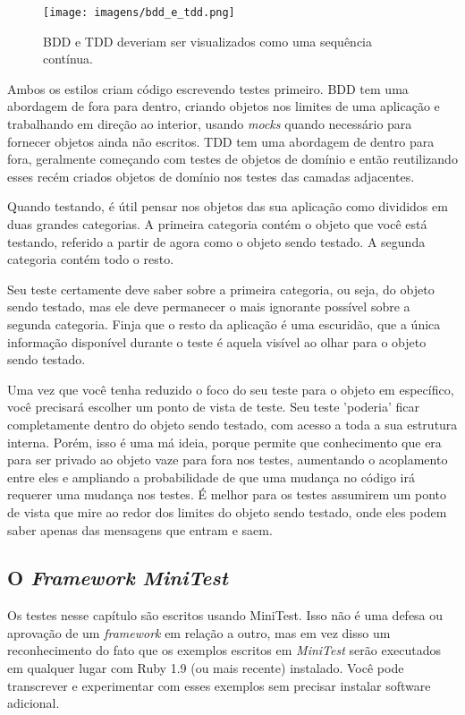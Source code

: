 \begin{figure}[!htbp]
  \center
  \texttt{[image: imagens/bdd\_e\_tdd.png]}
  \caption{BDD e TDD deveriam ser visualizados como uma sequência contínua.}
  \label{img:bdd_e_tdd}
\end{figure}

Ambos os estilos criam código escrevendo testes primeiro. BDD tem uma abordagem de fora para dentro, criando objetos nos limites de uma aplicação e trabalhando em direção ao interior, usando \textit{mocks} quando necessário para fornecer objetos ainda não escritos. TDD tem uma abordagem de dentro para fora, geralmente começando com testes de objetos de domínio e então reutilizando esses recém criados objetos de domínio nos testes das camadas adjacentes.

Quando testando, é útil pensar nos objetos das sua aplicação como divididos em duas grandes categorias. A primeira categoria contém o objeto que você está testando, referido a partir de agora como o objeto sendo testado. A segunda categoria contém todo o resto.

Seu teste certamente deve saber sobre a primeira categoria, ou seja, do objeto sendo testado, mas ele deve permanecer o mais ignorante possível sobre a segunda categoria. Finja que o resto da aplicação é uma escuridão, que a única informação disponível durante o teste é aquela visível ao olhar para o objeto sendo testado.

Uma vez que você tenha reduzido o foco do seu teste para o objeto em específico, você precisará escolher um ponto de vista de teste. Seu teste 'poderia' ficar completamente dentro do objeto sendo testado, com acesso a toda a sua estrutura interna. Porém, isso é uma má ideia, porque permite que conhecimento que era para ser privado ao objeto vaze para fora nos testes, aumentando o acoplamento entre eles e ampliando a probabilidade de que uma mudança no código irá requerer uma mudança nos testes. É melhor para os testes assumirem um ponto de vista que mire ao redor dos limites do objeto sendo testado, onde eles podem saber apenas das mensagens que entram e saem.

\subsection{O \textit{Framework MiniTest}}

Os testes nesse capítulo são escritos usando MiniTest. Isso não é uma defesa ou aprovação de um \textit{framework} em relação a outro, mas em vez disso um reconhecimento do fato que os exemplos escritos em \textit{MiniTest} serão executados em qualquer lugar com Ruby 1.9 (ou mais recente) instalado. Você pode transcrever e experimentar com esses exemplos sem precisar instalar software adicional.

